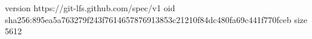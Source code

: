 version https://git-lfs.github.com/spec/v1
oid sha256:895ea5a763279f243f7614657876913853c21210f84dc480fa69c441f770fceb
size 5612
